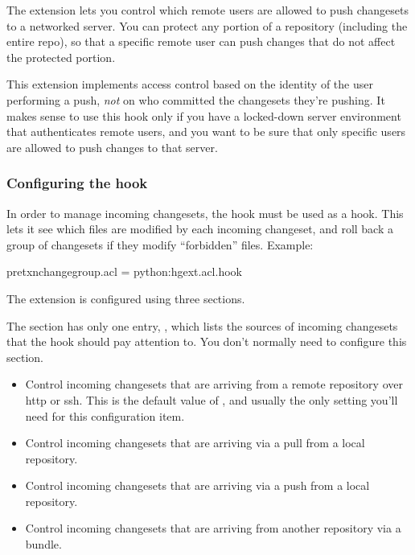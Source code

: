 The  extension lets you control which remote users are
allowed to push changesets to a networked server.  You can protect any
portion of a repository (including the entire repo), so that a
specific remote user can push changes that do not affect the protected
portion.

This extension implements access control based on the identity of the
user performing a push, \emph{not} on who committed the changesets
they're pushing.  It makes sense to use this hook only if you have a
locked-down server environment that authenticates remote users, and
you want to be sure that only specific users are allowed to push
changes to that server.

\subsubsection{Configuring the  hook}

In order to manage incoming changesets, the  hook must be
used as a  hook.  This lets it see which files
are modified by each incoming changeset, and roll back a group of
changesets if they modify ``forbidden'' files.  Example:
\begin{codesample2}
  [hooks]
  pretxnchangegroup.acl = python:hgext.acl.hook
\end{codesample2}

The  extension is configured using three sections.  

The  section has only one entry, ,
which lists the sources of incoming changesets that the hook should
pay attention to.  You don't normally need to configure this section.
\begin{itemize}
\item[\rcitem{acl}{serve}] Control incoming changesets that are arriving
  from a remote repository over http or ssh.  This is the default
  value of , and usually the only setting you'll
  need for this configuration item.
\item[\rcitem{acl}{pull}] Control incoming changesets that are
  arriving via a pull from a local repository.
\item[\rcitem{acl}{push}] Control incoming changesets that are
  arriving via a push from a local repository.
\item[\rcitem{acl}{bundle}] Control incoming changesets that are
  arriving from another repository via a bundle.
\end{itemize}

